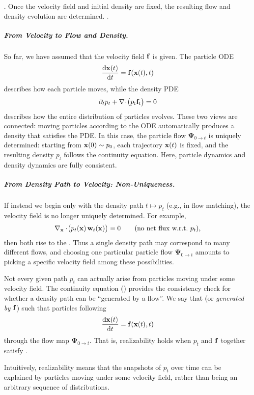 . Once the velocity field and
initial density are fixed, the resulting flow and density evolution are
determined. .
 

\subparagraph{From Velocity to Flow and Density.}
So far, we have assumed that the velocity field ${\mathbf{f}}$ is given.  
The particle ODE
\[
\frac{\mathop{}\!\mathrm{d} {\mathbf{x}}(t)}{\mathop{}\!\mathrm{d} t} = {\mathbf{f}}({\mathbf{x}}(t), t)
\]
describes how each particle moves, while the density PDE
\[
\partial_t p_t + \nabla \!\cdot \!\big(p_t {\mathbf{f}}_t\big) = 0
\]
describes how the entire distribution of particles evolves.  
These two views are connected: moving particles according to the ODE automatically produces a density that satisfies the PDE.  
In this case, the particle flow $\bm{\Psi}_{0\to t}$ is uniquely determined: starting from ${\mathbf{x}}(0)\sim p_0$, each trajectory ${\mathbf{x}}(t)$ is fixed, and the resulting density $p_t$ follows the continuity equation.  
Here, particle dynamics and density dynamics are fully consistent.

\subparagraph{From Density Path to Velocity: Non-Uniqueness.}
If instead we begin only with the density path $t \mapsto p_t$ (e.g.,  in flow matching), the velocity field is no longer uniquely determined.  
For example, 
\[
\nabla_{{\mathbf{x}}}\cdot\!\big(p_t({\mathbf{x}})\,\mathbf w_t({\mathbf{x}})\big)=0
\qquad\text{(no net flux w.r.t.\ $p_t$),}
\]
then both  rise to the .  
Thus a single density path may correspond to many different flows, and choosing one particular particle flow $\bm{\Psi}_{0\to t}$ amounts to picking a specific velocity field among these possibilities.

Not every given path $p_t$ can actually arise from particles moving under some velocity field.  
The continuity equation () provides the consistency check for whether a density path can be ``generated by a flow''.  
We say that  (or \emph{generated by} ${\mathbf{f}}$)  such that particles following
\[
\dfrac{\mathop{}\!\mathrm{d} {\mathbf{x}}(t)}{\mathop{}\!\mathrm{d} t} = {\mathbf{f}}({\mathbf{x}}(t), t)
\]
 through the flow map $\bm{\Psi}_{0\to t}$.  That is, realizability holds when $p_t$ and ${\mathbf{f}}$ together satisfy .

Intuitively, realizability means that the snapshots of $p_t$ over time can be explained by particles moving under some velocity field, rather than being an arbitrary sequence of distributions.  



